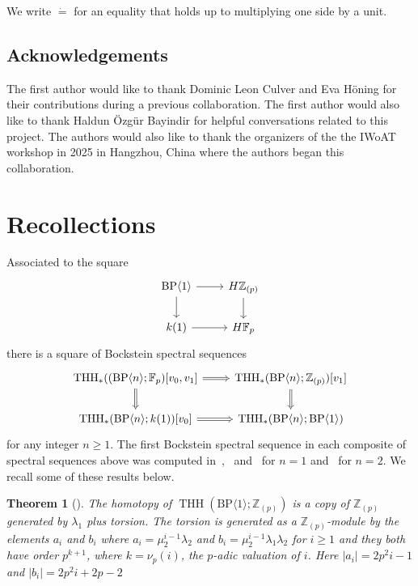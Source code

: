 \documentclass[11pt]{amsart}
\newcommand{\mr}[1]{\mathrm{#1}}
\newcommand{\BP}{\mr{BP}}
\DeclareMathOperator{\THH}{THH}
\newtheorem{theorem}[equation]{Theorem}
\theoremstyle{definition}
\numberwithin{equation}{section}
\numberwithin{figure}{section}
\begin{document}
We write $\dot{=}$ for an equality that holds up to multiplying one side by a unit. 

\subsection{Acknowledgements}
The first author would like to thank Dominic Leon Culver and Eva H\"oning for their contributions during a previous collaboration. The first author would also like to thank Haldun \"Ozg\"ur Bayindir for helpful conversations related to this project. The authors would also like to thank the organizers of the the IWoAT workshop in 2025 in Hangzhou, China where the authors began this collaboration. 
\section{Recollections}\label{recollections}


Associated to the square 
\[
\begin{tikzcd}
\BP\langle 1\rangle \ar[r] \ar[d] & H\mathbb{Z}_{(p)} \ar[d] \\ 
k(1) \ar[r] & H\mathbb{F}_p
\end{tikzcd}
\]
there is a square of Bockstein spectral sequences \[
\begin{tikzcd}
\THH_*((\BP\langle n \rangle ;\mathbb{F}_p)[v_0,v_1]\arrow[Rightarrow]{r} \arrow[Rightarrow]{d} &  \THH_*(\BP\langle n\rangle ;\mathbb{Z}_{(p)})[v_1]\arrow[Rightarrow]{d}\\ 
\THH_*(\BP\langle n\rangle ;k(1))[v_0]\arrow[Rightarrow]{r}  &  \THH_*(\BP\langle n \rangle ;\BP\langle 1\rangle) 
\end{tikzcd}
\]
for any integer $n\ge 1$. The first Bockstein spectral sequence in each composite of spectral sequences above was computed in~\cite{MS93},~\cite{AR05} and~\cite{AHL10} for $n=1$ and~\cite{ACH24} for $n=2$. We recall some of these results below. 

%
%
%
%
%
%
%

%
%
%
%
%
%
%

\begin{theorem}[{\cite[\S~3.2]{AHL10}}]
The homotopy of $\THH(\BP\langle 1\rangle;\mathbb{Z}_{(p)})$ is a copy of $\mathbb{Z}_{(p)}$ generated by $\lambda_1$ plus torsion. The torsion is generated as a $\mathbb{Z}_{(p)}$-module by the
elements $a_i$ and $b_i$ where $a_i=\mu_2^{i-1}\lambda_2$ and $b_i=\mu_2^{i-1}\lambda_1\lambda_2$ for $i\ge 1$ and they both have order $p^{k+1}$, where $k= \nu_{p}(i)$, the
$p$-adic valuation of $i$. Here $|a_i|=2p^2i-1$ and $|b_i|=2p^2i+2p-2$
\end{theorem}
\end{document}
